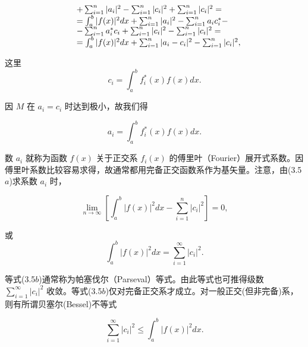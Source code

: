 \begin{equation*}
\begin{array}{r l} & + \sum_ {i = 1} ^ {n} | a _ {i} | ^ {2} - \sum_ {i = 1} ^ {n} | c _ {i} | ^ {2} + \sum_ {i = 1} ^ {n} | c _ {i} | ^ {2} = \\ & = \int_ {a} ^ {b} | f (x) | ^ {2} d x + \sum_ {i = 1} ^ {n} | a _ {i} | ^ {2} - \sum_ {i = 1} ^ {n} a _ {i} c _ {i} ^ {*} - \\ & - \sum_ {i = 1} ^ {n} a _ {i} ^ {*} c _ {i} + \sum_ {i = 1} ^ {n} | c _ {i} | ^ {2} - \sum_ {i = 1} ^ {n} | c _ {i} | ^ {2} = \\ & = \int_ {a} ^ {b} | f (x) | ^ {2} d x + \sum_ {i = 1} ^ {n} | a _ {i} - c _ {i} | ^ {2} - \sum_ {i = 1} ^ {n} | c _ {i} | ^ {2}, \end{array}
\end{equation*}

这里
\begin{equation*}
c _ {i} = \int_ {a} ^ {b} f _ {i} ^ {*} (x) f (x) d x.
\end{equation*}

因 $M$ 在 $a_{i} = c_{i}$ 时达到极小，故我们得

\begin{equation*}
a _ {i} = \int_ {a} ^ {b} f _ {i} ^ {*} (x) f (x) d x.\tag{3.5a}
\end{equation*}

数 $a_{i}$ 就称为函数 $f(x)$ 关于正交系 $f_{i}(x)$ 的傅里叶（Fourier）展开式系数。因傅里叶系数比较容易求得，故通常都用完备正交函数系作为基矢量。注意，由(3.5$a$)求系数 $a_{i}$ 时，

\begin{equation*}
\lim _ {n \rightarrow \infty} \left[ \int_ {a} ^ {b} | f (x) | ^ {2} d x - \sum_ {i = 1} ^ {n} | c _ {i} | ^ {2} \right] = 0,
\end{equation*}

或
\begin{equation*}
\int_ {a} ^ {b} | f (x) | ^ {2} d x = \sum_ {i = 1} ^ {\infty} | c _ {i} | ^ {2}.\tag{3.5b}
\end{equation*}

等式(3.5$b$)通常称为帕塞伐尔（Parseval）等式。由此等式也可推得级数 $\sum_{i=1}^{\infty}|c_i|^2$ 收敛。等式(3.5$b$)仅对完备正交系才成立。对一般正交(但非完备)系，则有所谓贝塞尔(Bessel)不等式

\begin{equation*}
\sum_ {i = 1} ^ {\infty} \left| c _ {i} \right| ^ {2} \leqslant \int_ {a} ^ {b} | f (x) | ^ {2} d x.
\end{equation*}

